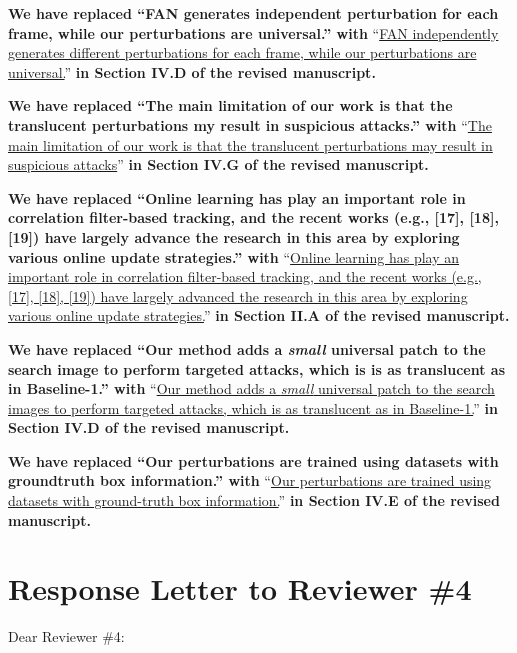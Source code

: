 \documentclass[12pt]{article}
\begin{document}
\textbf{We have replaced ``FAN generates independent perturbation for each frame, while our perturbations are universal.'' with} ``\uline{FAN independently generates different perturbations for each frame, while our perturbations are universal.}'' \textbf{in Section IV.D of the revised manuscript.}

\textbf{We have replaced ``The main limitation of our work is that the translucent perturbations my result in suspicious attacks.'' with} ``\uline{The main limitation of our work is that the translucent perturbations may result in suspicious attacks}'' \textbf{in Section IV.G of the revised manuscript.}

\textbf{We have replaced ``Online learning has play an important role in correlation filter-based tracking, and the recent works (e.g., [17], [18], [19]) have largely advance the research in this area by exploring various online update strategies.'' with} ``\uline{Online learning has play an important role in correlation filter-based tracking, and the recent works (e.g., [17], [18], [19]) have largely advanced the research in this area by exploring various online update strategies.}'' \textbf{in Section II.A of the revised manuscript.}

\textbf{We have replaced ``Our method adds a \textit{small} universal patch to the search image to perform targeted attacks, which is is as translucent as in Baseline-1.'' with} ``\uline{Our method adds a \textit{small} universal patch to the search images to perform targeted attacks, which is as translucent as in Baseline-1.}'' \textbf{in Section IV.D of the revised manuscript.}

\textbf{We have replaced ``Our perturbations are trained using datasets with groundtruth box information.'' with} ``\uline{Our perturbations are trained using datasets with ground-truth box information.}'' \textbf{in Section IV.E of the revised manuscript.}

\clearpage
\newpage
{\centering\section*{Response Letter to Reviewer \#4}}
\noindent Dear Reviewer \#4:
\end{document}
